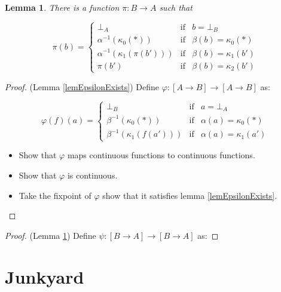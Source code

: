 \documentclass[a4paper]{article}
\newcommand{\arr}{\rightarrow}
\newtheorem{lemma}[definition]{Lemma}
\begin{document}
\begin{lemma} \label{lemPiExists}
There is a function $\pi : B \arr A$ such that

\begin{equation*}
\pi(b) = \left\{
  \begin{array}{rcl}
   \bot_A & \text{if} & b = \bot_B \\
   \alpha^{-1}(\kappa_0(*)) & \text{if} & \beta(b) = \kappa_0(*) \\
   \alpha^{-1}(\kappa_1(\pi(b'))) & \text{if} & \beta(b) = \kappa_1(b') \\
   \pi(b') & \text{if} & \beta(b) = \kappa_2(b')
  \end{array}
\right.
\end{equation*}

\end{lemma}

\begin{proof}

(Lemma \ref{lemEpsilonExists}) Define $\varphi : [A \arr B] \arr [A \arr B]$ as:

\begin{equation*}
\varphi(f)(a) = \left\{
  \begin{array}{rcl}
   \bot_B & \text{if} & a = \bot_A \\
   \beta^{-1}(\kappa_0(*)) & \text{if} & \alpha(a) = \kappa_0(*) \\
   \beta^{-1}(\kappa_1(f(a'))) & \text{if} & \alpha(a) = \kappa_1(a')
  \end{array}
\right.
\end{equation*}

\begin{itemize}
\item Show that $\varphi$ maps continuous functions to continuous functions.
\item Show that $\varphi$ is continuous.
\item Take the fixpoint of $\varphi$ show that it satisfies lemma
\ref{lemEpsilonExists}.
\end{itemize}


\end{proof}

\begin{proof}
(Lemma \ref{lemPiExists}) Define $\psi : [B \arr A] \arr [B \arr A]$ as:
\end{proof}


\section{Junkyard}
\end{document}
